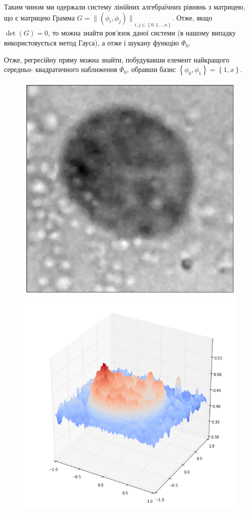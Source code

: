 Таким чином ми одержали систему лінійних алгебраїчних рівнянь з матрицею, що є матрицею Грамма $G = {\|\left(\phi_i, \phi_j \right)\|}_{i, j \in \left\{ 0, 1, \dots n\right\}}.$ Отже, якщо $\det\left(G\right) = 0$, то можна знайти ров'язок даної системи (в нашому випадку використовується метод Гауса), а отже і шукану функцію $\Phi_0$.

Отже, регресійну пряму можна знайти, побудувавши елемент найкращого середньо- квадратичного наближення $\Phi_0$, обравши базис $\left\{\phi_0, \phi_1 \right\} = \left\{1, x \right\}$.

\begin{figure}[b!]
	\minipage{\textwidth}
	\centering
	\includegraphics[width=1\linewidth]{Figures/Chapter3/fdim_0_1.png}
	\endminipage\hfill
	\centering	
	\includegraphics[width=1\linewidth]{Figures/Chapter3/fdim_0_2.png}

\end{figure}
